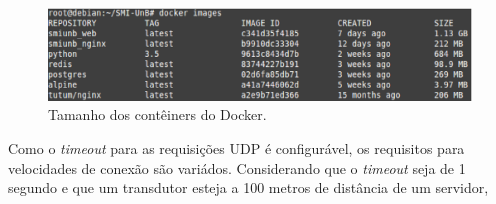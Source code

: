     \begin{figure}[!h]
        \centering
        \includegraphics[keepaspectratio=true,scale=0.55]{figuras/docker_size.eps}
        \caption{Tamanho dos contêiners do Docker.}
        \label{docker_size}
    \end{figure}

    Como o \textit{timeout} para as requisições UDP é configurável, os requisitos para velocidades de conexão são variádos. Considerando que o \textit{timeout} seja de 1 segundo e que um transdutor esteja a 100 metros de distância de um servidor,